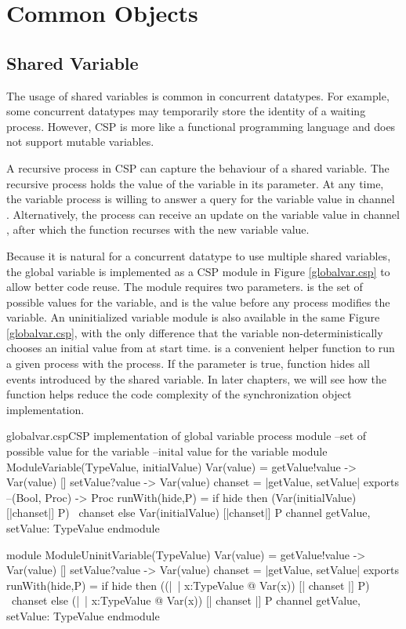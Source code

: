 \documentclass{article}
\begin{document}
\section{Common Objects}
\subsection{Shared Variable}
The usage of shared variables is common in concurrent datatypes. For example, some concurrent datatypes may temporarily store the identity of a waiting process. However, CSP is more like a functional programming language and does not support mutable variables. 

A recursive process in CSP can capture the behaviour of a shared variable. The recursive process holds the value of the variable in its parameter. At any time, the variable process is willing to answer a query for the variable value in channel . Alternatively, the process can receive an update on the variable value in channel , after which the function recurses with the new variable value.

Because it is natural for a concurrent datatype to use multiple shared variables, the global variable is implemented as a CSP module in Figure \ref{globalvar.csp} to allow better code reuse. The module requires two parameters.  is the set of possible values for the variable, and  is the value before any process modifies the variable. An uninitialized variable module is also available in the same Figure \ref{globalvar.csp}, with the only difference that the variable non-deterministically chooses an initial value from  at start time.  is a convenient helper function to run a given process  with the  process. If the parameter  is true,  function hides all events introduced by the shared variable. In later chapters, we will see how the  function helps reduce the code complexity of the synchronization object implementation.

\begin{cspinline}{globalvar.csp}{CSP implementation of global variable process module}
--set of possible value for the variable
--inital value for the variable
module ModuleVariable(TypeValue, initialValue)
  Var(value) = getValue!value -> Var(value)
             [] setValue?value -> Var(value)
  chanset = {|getValue, setValue|}
exports
  --(Bool, Proc) -> Proc
  runWith(hide,P) = if hide then (Var(initialValue) [|chanset|] P) \ chanset
                            else  Var(initialValue) [|chanset|] P
  channel getValue, setValue: TypeValue
endmodule

module ModuleUninitVariable(TypeValue)
  Var(value) = getValue!value -> Var(value)
            [] setValue?value -> Var(value)
  chanset = {|getValue, setValue|}
exports
  runWith(hide,P) = 
    if hide then ((|~| x:TypeValue @ Var(x)) [| chanset |] P) \ chanset
    else (|~| x:TypeValue @ Var(x)) [| chanset |] P
  channel getValue, setValue: TypeValue
endmodule
\end{cspinline}
\end{document}
